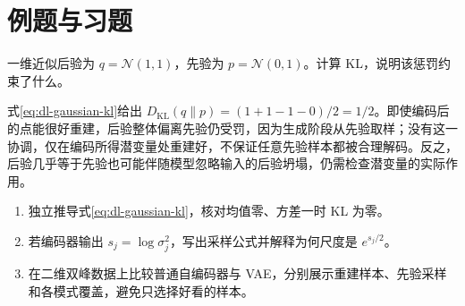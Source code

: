 \section{例题与习题}
\begin{example}[重建好不等于从先验生成好]
一维近似后验为 $q=\mathcal N(1,1)$，先验为 $p=\mathcal N(0,1)$。计算 KL，说明该惩罚约束了什么。
\end{example}
\begin{solve}
式\eqref{eq:dl-gaussian-kl}给出 $D_{\mathrm{KL}}(q\|p)=(1+1-1-0)/2=1/2$。即使编码后的点能很好重建，后验整体偏离先验仍受罚，因为生成阶段从先验取样；没有这一协调，仅在编码所得潜变量处重建好，不保证任意先验样本都被合理解码。反之，后验几乎等于先验也可能伴随模型忽略输入的后验坍塌，仍需检查潜变量的实际作用。
\end{solve}
\begin{enumerate}
\item 独立推导式\eqref{eq:dl-gaussian-kl}，核对均值零、方差一时 KL 为零。
\item 若编码器输出 $s_j=\log\sigma_j^2$，写出采样公式并解释为何尺度是 $e^{s_j/2}$。
\item 在二维双峰数据上比较普通自编码器与 VAE，分别展示重建样本、先验采样和各模式覆盖，避免只选择好看的样本。
\end{enumerate}

